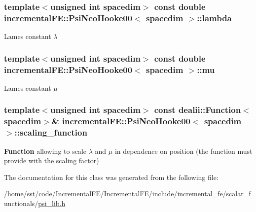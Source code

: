 \subsubsection[{\texorpdfstring{lambda}{lambda}}]{\setlength{\rightskip}{0pt plus 5cm}template$<$unsigned int spacedim$>$ const double {\bf incremental\+F\+E\+::\+Psi\+Neo\+Hooke00}$<$ spacedim $>$\+::lambda\hspace{0.3cm}{\ttfamily [private]}}\hypertarget{classincremental_f_e_1_1_psi_neo_hooke00_a8d6349afc4a3053f86b33db165a9a158}{}\label{classincremental_f_e_1_1_psi_neo_hooke00_a8d6349afc4a3053f86b33db165a9a158}
Lame\textquotesingle{}s constant $\lambda$ 
\subsubsection[{\texorpdfstring{mu}{mu}}]{\setlength{\rightskip}{0pt plus 5cm}template$<$unsigned int spacedim$>$ const double {\bf incremental\+F\+E\+::\+Psi\+Neo\+Hooke00}$<$ spacedim $>$\+::mu\hspace{0.3cm}{\ttfamily [private]}}\hypertarget{classincremental_f_e_1_1_psi_neo_hooke00_a73d67e211d564b621cfbd934ab1e2924}{}\label{classincremental_f_e_1_1_psi_neo_hooke00_a73d67e211d564b621cfbd934ab1e2924}
Lame\textquotesingle{}s constant $\mu$ 
\subsubsection[{\texorpdfstring{scaling\+\_\+function}{scaling_function}}]{\setlength{\rightskip}{0pt plus 5cm}template$<$unsigned int spacedim$>$ const dealii\+::\+Function$<$spacedim$>$\& {\bf incremental\+F\+E\+::\+Psi\+Neo\+Hooke00}$<$ spacedim $>$\+::scaling\+\_\+function\hspace{0.3cm}{\ttfamily [private]}}\hypertarget{classincremental_f_e_1_1_psi_neo_hooke00_afa1ee9fcb2f0f52c12c07845844e1ed0}{}\label{classincremental_f_e_1_1_psi_neo_hooke00_afa1ee9fcb2f0f52c12c07845844e1ed0}
{\bf Function} allowing to scale $\lambda$ and $\mu$ in dependence on position (the function must provide with the scaling factor) 

The documentation for this class was generated from the following file\+:\begin{DoxyCompactItemize}
\item 
/home/sst/code/\+Incremental\+F\+E/\+Incremental\+F\+E/include/incremental\+\_\+fe/scalar\+\_\+functionals/\hyperlink{psi__lib_8h}{psi\+\_\+lib.\+h}\end{DoxyCompactItemize}
